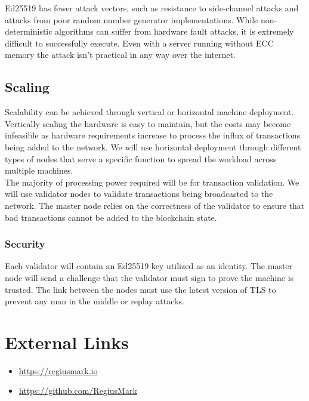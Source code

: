 \documentclass[12pt,a4paper]{article}
\begin{document}
  Ed25519 has fewer attack vectors, such as resistance to side-channel attacks
  and attacks from poor random number generator implementations. While
  non-deterministic algorithms can suffer from hardware fault attacks, it is
  extremely difficult to successfully execute. Even with a server running
  without ECC memory the attack isn't practical in any way over the
  internet.

  \subsection{Scaling}
  Scalability can be achieved through vertical or horizontal machine deployment.
  Vertically scaling the hardware is easy to maintain, but the costs may become
  infeasible as hardware requirements increase to process the influx of
  transactions being added to the network. We will use horizontal deployment
  through different types of nodes that serve a specific function to spread the
  workload across multiple machines.\\

  The majority of processing power required will be for transaction validation.
  We will use validator nodes to validate transactions being broadcasted to the
  network. The master node relies on the correctness of the validator to ensure
  that bad transactions cannot be added to the blockchain state.\\

  \subsubsection{Security}
  Each validator will contain an Ed25519 key utilized as an identity. The master
  node will send a challenge that the validator must sign to prove the machine
  is trusted. The link between the nodes must use the latest version of TLS to
  prevent any man in the middle or replay attacks.

  \newpage
  \section*{External Links}
  \begin{itemize}
    \item{\url{https://regiusmark.io}}
    \item{\url{https://github.com/RegiusMark}}
  \end{itemize}
  \printbibliography{}
\end{document}
